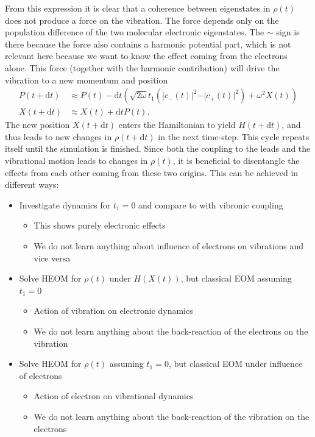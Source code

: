 \documentclass{article}
\newcommand{\dif}{\mathrm{d}}
\begin{document}
From this expression it is clear that a coherence between eigenstates in $\rho(t)$ does not produce a force on the vibration. The force depends only on the population difference of the two molecular electronic eigenstates. The $\sim$ sign is there because the force also contains a harmonic potential part, which is not relevant here because we want to know the effect coming from the electrons alone. This force (together with the harmonic contribution) will drive the vibration to a new momentum and position
\begin{align*}
	P(t+\dif t) &\approx  P(t) - \dif t (\sqrt{2\omega}t_1(\vert c_-(t)\vert^2 - \vert c_+(t)\vert^2 ) + \omega^2 X(t)) \\
	X(t+\dif t) &\approx X(t) + \dif t P(t).
\end{align*}
The new position $X(t+\dif  t)$ enters the Hamiltonian to yield $H(t+\dif t)$, and thus leads to new changes in $\rho(t+\dif t)$ in the next time-step. This cycle repeats itself until the simulation is finished. Since both the coupling to the leads and the vibrational motion leads to changes in $\rho(t)$, it is beneficial to disentangle the effects from each other coming from these two origins. This can be achieved in different ways: 
\begin{itemize}
	\item Investigate dynamics for $t_1=0$ and compare to with vibronic coupling
	\begin{itemize}
		\item This shows purely electronic effects
		\item We do not learn anything about influence of electrons on vibrations and vice versa
	\end{itemize}
	\item Solve HEOM for $\rho(t)$ under $H(X(t))$, but classical EOM assuming $t_1=0$
	\begin{itemize}
		\item Action of vibration on electronic dynamics
		\item We do not learn anything about the back-reaction of the electrons on the vibration
	\end{itemize}
	\item Solve HEOM for $\rho(t)$ assuming $t_1 = 0$, but classical EOM under influence of electrons
	\begin{itemize}
		\item Action of electron on vibrational dynamics 
		\item We do not learn anything about the back-reaction of the vibration on the electrons
	\end{itemize}
\end{itemize}
\end{document}
